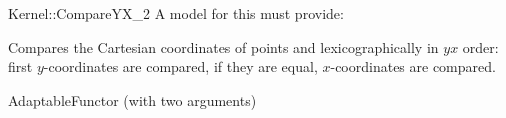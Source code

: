 \begin{ccRefFunctionObjectConcept}{Kernel::CompareYX_2}
A model for this must provide:


      {Compares the Cartesian coordinates of points  and
        lexicographically in $yx$ order: first 
       $y$-coordinates are compared, if they are equal, $x$-coordinates
       are compared.}

\ccRefines
AdaptableFunctor (with two arguments)

\ccSeeAlso
{} \\
 \\

\end{ccRefFunctionObjectConcept}
